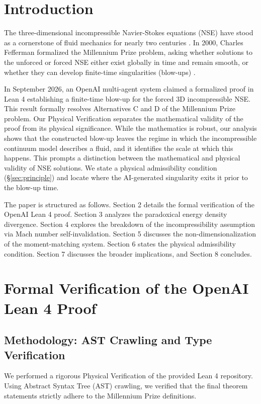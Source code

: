 \documentclass[11pt,a4paper]{article}
\theoremstyle{definition}
\begin{document}
\section{Introduction}

The three-dimensional incompressible Navier-Stokes equations (NSE) have stood as a cornerstone of fluid mechanics for nearly two centuries \cite{Leray1934}. In 2000, Charles Fefferman formalized the Millennium Prize problem, asking whether solutions to the unforced or forced NSE either exist globally in time and remain smooth, or whether they can develop finite-time singularities (blow-ups) \cite{Fefferman2000}.

In September 2026, an OpenAI multi-agent system claimed a formalized proof in Lean 4 establishing a finite-time blow-up for the forced 3D incompressible NSE. This result formally resolves Alternatives C and D of the Millennium Prize problem. Our Physical Verification separates the mathematical validity of the proof from its physical significance. While the mathematics is robust, our analysis shows that the constructed blow-up leaves the regime in which the incompressible continuum model describes a fluid, and it identifies the scale at which this happens. This prompts a distinction between the mathematical and physical validity of NSE solutions. We state a physical admissibility condition (\S\ref{sec:principle}) and locate where the AI-generated singularity exits it prior to the blow-up time.

The paper is structured as follows. Section 2 details the formal verification of the OpenAI Lean 4 proof. Section 3 analyzes the paradoxical energy density divergence. Section 4 explores the breakdown of the incompressibility assumption via Mach number self-invalidation. Section 5 discusses the non-dimensionalization of the moment-matching system. Section 6 states the physical admissibility condition. Section 7 discusses the broader implications, and Section 8 concludes.

\section{Formal Verification of the OpenAI Lean 4 Proof}

\subsection{Methodology: AST Crawling and Type Verification}
We performed a rigorous Physical Verification of the provided Lean 4 repository. Using Abstract Syntax Tree (AST) crawling, we verified that the final theorem statements strictly adhere to the Millennium Prize definitions.
\end{document}
